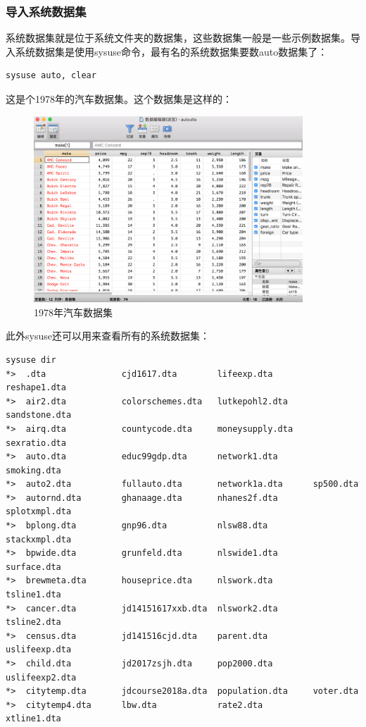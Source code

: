 \documentclass[]{ctexbook}
\begin{document}
\hypertarget{section-12}{%
\subsubsection{导入系统数据集}\label{section-12}}

系统数据集就是位于系统文件夹的数据集，这些数据集一般是一些示例数据集。导入系统数据集是使用sysuse命令，最有名的系统数据集要数auto数据集了：

\begin{lstlisting}
sysuse auto, clear
\end{lstlisting}

这是个1978年的汽车数据集。这个数据集是这样的：

\begin{figure}

{\centering \includegraphics[width=0.9\textwidth]{assets/auto} 

}

\caption{1978年汽车数据集}\label{fig:auto}
\end{figure}

此外sysuse还可以用来查看所有的系统数据集：

\begin{lstlisting}
sysuse dir
*>  .dta               cjd1617.dta        lifeexp.dta        reshape1.dta
*>  air2.dta           colorschemes.dta   lutkepohl2.dta     sandstone.dta
*>  airq.dta           countycode.dta     moneysupply.dta    sexratio.dta
*>  auto.dta           educ99gdp.dta      network1.dta       smoking.dta
*>  auto2.dta          fullauto.dta       network1a.dta      sp500.dta
*>  autornd.dta        ghanaage.dta       nhanes2f.dta       splotxmpl.dta
*>  bplong.dta         gnp96.dta          nlsw88.dta         stackxmpl.dta
*>  bpwide.dta         grunfeld.dta       nlswide1.dta       surface.dta
*>  brewmeta.dta       houseprice.dta     nlswork.dta        tsline1.dta
*>  cancer.dta         jd14151617xxb.dta  nlswork2.dta       tsline2.dta
*>  census.dta         jd141516cjd.dta    parent.dta         uslifeexp.dta
*>  child.dta          jd2017zsjh.dta     pop2000.dta        uslifeexp2.dta
*>  citytemp.dta       jdcourse2018a.dta  population.dta     voter.dta
*>  citytemp4.dta      lbw.dta            rate2.dta          xtline1.dta
\end{lstlisting}
\end{document}
